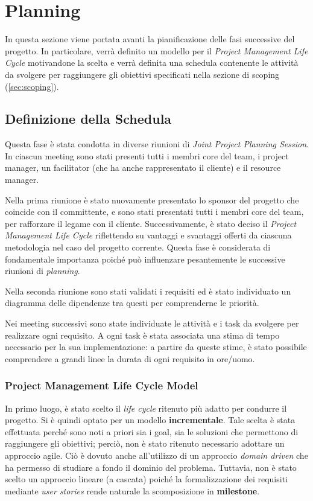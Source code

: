 \section{Planning}
\label{sec:planning}

In questa sezione viene portata avanti la pianificazione delle fasi successive del progetto. In particolare, verrà definito un modello per il \textit{Project Management Life Cycle} motivandone la scelta e verrà definita una schedula contenente le attività da svolgere per raggiungere gli obiettivi specificati nella sezione di scoping (\ref{sec:scoping}).

\subsection{Definizione della Schedula}
Questa fase è stata condotta in diverse riunioni di \textit{Joint Project Planning Session}. In ciascun meeting sono stati presenti tutti i membri core del team, i project manager, un facilitator (che ha anche rappresentato il cliente) e il resource manager.

Nella prima riunione è stato nuovamente presentato lo sponsor del progetto che coincide con il committente, e sono stati presentati tutti i membri core del team, per rafforzare il legame con il cliente. Successivamente, è stato deciso il \textit{Project Management Life Cycle} riflettendo su vantaggi e svantaggi offerti da ciascuna metodologia nel caso del progetto corrente. Questa fase è considerata di fondamentale importanza poiché può influenzare pesantemente le successive riunioni di \textit{planning}.

Nella seconda riunione sono stati validati i requisiti ed è stato individuato un diagramma delle dipendenze tra questi per comprenderne le priorità.

Nei meeting successivi sono state individuate le attività e i task da svolgere per realizzare ogni requisito. A ogni task è stata associata una stima di tempo necessario per la sua implementazione: a partire da queste stime, è stato possibile comprendere a grandi linee la durata di ogni requisito in ore/uomo.

\subsubsection{Project Management Life Cycle Model}
In primo luogo, è stato scelto il \textit{life cycle} ritenuto più adatto per condurre il progetto. Si è quindi optato per un modello \textbf{incrementale}. Tale scelta è stata effettuata perché sono noti a priori sia i goal, sia le soluzioni che permettono di raggiungere gli obiettivi; perciò, non è stato ritenuto necessario adottare un approccio agile. Ciò è dovuto anche all'utilizzo di un approccio \textit{domain driven} che ha permesso di studiare a fondo il dominio del problema. Tuttavia, non è stato scelto un approccio lineare (a cascata) poiché la formalizzazione dei requisiti mediante \textit{user stories} rende naturale la scomposizione in \textbf{milestone}.

